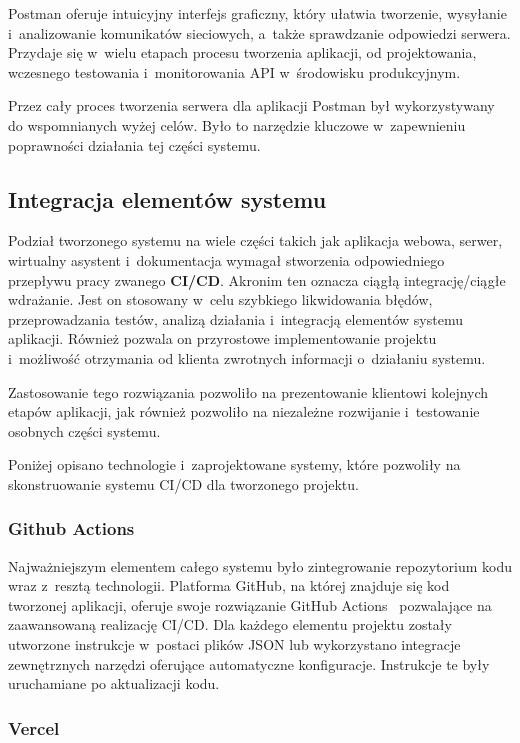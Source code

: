 Postman oferuje intuicyjny interfejs graficzny, który ułatwia tworzenie,
wysyłanie i~analizowanie komunikatów sieciowych, a~także sprawdzanie
odpowiedzi serwera. Przydaje się w~wielu etapach procesu tworzenia
aplikacji, od projektowania, wczesnego testowania i~monitorowania API
w~środowisku produkcyjnym.

Przez cały proces tworzenia serwera dla aplikacji Postman był wykorzystywany
do wspomnianych wyżej celów. Było to narzędzie kluczowe w~zapewnieniu
poprawności działania tej części systemu.


\subsection{Integracja elementów systemu}

Podział tworzonego systemu na wiele części
takich jak aplikacja webowa, serwer, wirtualny asystent
i~dokumentacja wymagał stworzenia odpowiedniego
przepływu pracy zwanego \mbox{\textbf{CI/CD}}. Akronim ten oznacza
ciągłą integrację/ciągłe wdrażanie. Jest on stosowany
w~celu szybkiego likwidowania błędów, przeprowadzania
testów, analizą działania i~integracją elementów systemu
aplikacji. Również pozwala on przyrostowe implementowanie
projektu i~możliwość otrzymania od klienta zwrotnych
informacji o~działaniu systemu.

Zastosowanie tego rozwiązania pozwoliło na
prezentowanie klientowi kolejnych etapów aplikacji, jak
również pozwoliło na niezależne rozwijanie
i~testowanie osobnych części systemu.

Poniżej opisano technologie i~zaprojektowane systemy,
które pozwoliły na skonstruowanie systemu CI/CD dla
tworzonego projektu.


\subsubsection{Github Actions}

Najważniejszym elementem całego systemu było zintegrowanie
repozytorium kodu
wraz z~resztą technologii. Platforma GitHub, na której
znajduje się kod tworzonej aplikacji, oferuje swoje
rozwiązanie GitHub Actions~\cite{GithubActions} pozwalające
na zaawansowaną realizację CI/CD. Dla każdego elementu
projektu zostały utworzone instrukcje w~postaci plików JSON
lub wykorzystano integracje zewnętrznych narzędzi oferujące
automatyczne konfiguracje. Instrukcje te były uruchamiane
po aktualizacji kodu.


\subsubsection{Vercel}

